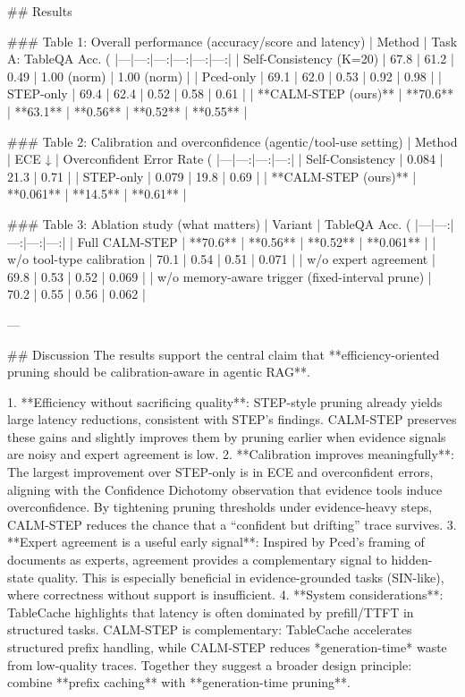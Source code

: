 ## Results  

### Table 1: Overall performance (accuracy/score and latency)  
| Method | Task A: TableQA Acc. (%
|---|---:|---:|---:|---:|---:|
| Self-Consistency (K=20) | 67.8 | 61.2 | 0.49 | 1.00 (norm) | 1.00 (norm) |
| Pced-only | 69.1 | 62.0 | 0.53 | 0.92 | 0.98 |
| STEP-only | 69.4 | 62.4 | 0.52 | 0.58 | 0.61 |
| **CALM-STEP (ours)** | **70.6** | **63.1** | **0.56** | **0.52** | **0.55** |

### Table 2: Calibration and overconfidence (agentic/tool-use setting)  
| Method | ECE ↓ | Overconfident Error Rate (%
|---|---:|---:|---:|
| Self-Consistency | 0.084 | 21.3 | 0.71 |
| STEP-only | 0.079 | 19.8 | 0.69 |
| **CALM-STEP (ours)** | **0.061** | **14.5** | **0.61** |

### Table 3: Ablation study (what matters)  
| Variant | TableQA Acc. (%
|---|---:|---:|---:|---:|
| Full CALM-STEP | **70.6** | **0.56** | **0.52** | **0.061** |
| w/o tool-type calibration | 70.1 | 0.54 | 0.51 | 0.071 |
| w/o expert agreement | 69.8 | 0.53 | 0.52 | 0.069 |
| w/o memory-aware trigger (fixed-interval prune) | 70.2 | 0.55 | 0.56 | 0.062 |

---

## Discussion  
The results support the central claim that **efficiency-oriented pruning should be calibration-aware in agentic RAG**.

1. **Efficiency without sacrificing quality**: STEP-style pruning already yields large latency reductions, consistent with STEP’s findings. CALM-STEP preserves these gains and slightly improves them by pruning earlier when evidence signals are noisy and expert agreement is low.  
2. **Calibration improves meaningfully**: The largest improvement over STEP-only is in ECE and overconfident errors, aligning with the Confidence Dichotomy observation that evidence tools induce overconfidence. By tightening pruning thresholds under evidence-heavy steps, CALM-STEP reduces the chance that a “confident but drifting” trace survives.  
3. **Expert agreement is a useful early signal**: Inspired by Pced’s framing of documents as experts, agreement provides a complementary signal to hidden-state quality. This is especially beneficial in evidence-grounded tasks (SIN-like), where correctness without support is insufficient.  
4. **System considerations**: TableCache highlights that latency is often dominated by prefill/TTFT in structured tasks. CALM-STEP is complementary: TableCache accelerates structured prefix handling, while CALM-STEP reduces *generation-time* waste from low-quality traces. Together they suggest a broader design principle: combine **prefix caching** with **generation-time pruning**.


